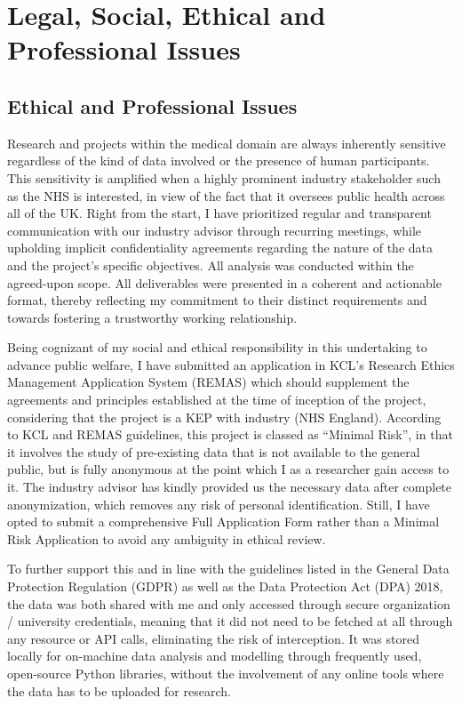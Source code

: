 \section{Legal, Social, Ethical and Professional Issues}

\subsection{Ethical and Professional Issues}
\noindent Research and projects within the medical domain are always inherently sensitive regardless of the kind of data involved or the presence of human participants. This sensitivity is amplified when a highly prominent industry stakeholder such as the NHS is interested, in view of the fact that it oversees public health across all of the UK. Right from the start, I have prioritized regular and transparent communication with our industry advisor through recurring meetings, while upholding implicit confidentiality agreements regarding the nature of the data and the project’s specific objectives. All analysis was conducted within the agreed-upon scope. All deliverables were presented in a coherent and actionable format, thereby reflecting my commitment to their distinct requirements and towards fostering a trustworthy working relationship.

\vspace{5pt}
\noindent Being cognizant of my social and ethical responsibility in this undertaking to advance public welfare, I have submitted an application in KCL’s Research Ethics Management Application System (REMAS) which should supplement the agreements and principles established at the time of inception of the project, considering that the project is a KEP with industry (NHS England). According to KCL and REMAS guidelines, this project is classed as “Minimal Risk”, in that it involves the study of pre-existing data that is not available to the general public, but is fully anonymous at the point which I as a researcher gain access to it. The industry advisor has kindly provided us the necessary data after complete anonymization, which removes any risk of personal identification. Still, I have opted to submit a comprehensive Full Application Form rather than a Minimal Risk Application to avoid any ambiguity in ethical review.

\vspace{5pt}
\noindent To further support this and in line with the guidelines listed in the General Data Protection Regulation (GDPR) as well as the Data Protection Act (DPA) 2018, the data was both shared with me and only accessed through secure organization / university credentials, meaning that it did not need to be fetched at all through any resource or API calls, eliminating the risk of interception. It was stored locally for on-machine data analysis and modelling through frequently used, open-source Python libraries, without the involvement of any online tools where the data has to be uploaded for research.

